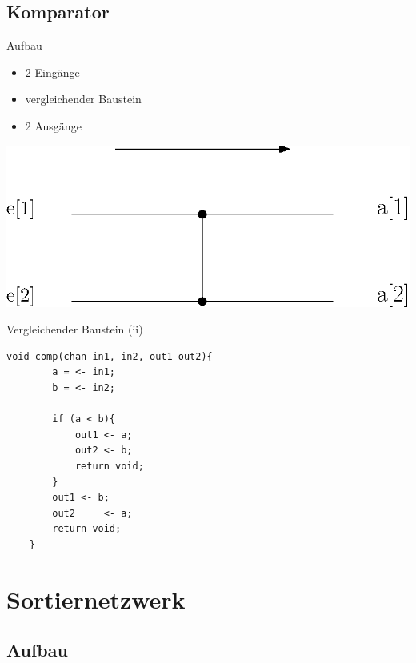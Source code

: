 \documentclass[ucs,9pt]{beamer}
\begin{document}
\subsection{Komparator}
\begin{frame}{Aufbau}
    \begin{minipage}[c]{14.5cm}
    		\begin{minipage}[c]{5cm}
        		\begin{itemize}
            		\item 2 Eingänge
	            	\item vergleichender Baustein
    		        	\item 2 Ausgänge
        		\end{itemize}
	    \end{minipage}
		\begin{minipage}[c]{5cm}
			\includegraphics[scale=0.5]{Komparator1.eps}
	 	\end{minipage}
    \end{minipage}
\end{frame}

\begin{frame}[fragile]{Vergleichender Baustein (ii)}
\begin{lstlisting}[laguage={inform},tabsize=4]
    void comp(chan in1, in2, out1 out2){
        a = <- in1;
        b = <- in2;
        
        if (a < b){
            out1 <- a;
            out2 <- b;
            return void;
        }
        out1 <- b;
        out2	 <- a;
        return void;
    }
\end{lstlisting}
\end{frame}

\section{Sortiernetzwerk}
\subsection{Aufbau}
\end{document}
